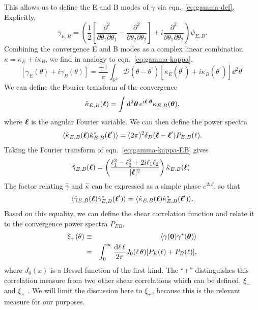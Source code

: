 This allows us to define the E and B modes of $\gamma$ via
eqn.~\ref{eq:gamma-def}.  Explicitly,
\begin{equation}
  \gamma_{E,B} = \left(\frac{1}{2}\left[\frac{\partial^2}{\partial \theta_1\partial\theta_1}
  - \frac{\partial^2}{\partial \theta_2\partial\theta_2}\right]
  + i\frac{\partial^2}{\partial \theta_1\partial\theta_2}\right)
  \psi_{E,B}.
\end{equation}
Combining the convergence E and B modes as a complex linear combination
$\kappa = \kappa_E + i\kappa_B$, we find in analogy to
eqn.~\ref{eq:gamma-kappa},
\begin{equation}
  \label{eq:gamma-kappa-EB}
  \left[\gamma_E(\theta) + i\gamma_B(\theta)\right]
  = \frac{-1}{\pi}\int_{\mathbb{R}^2} \mathcal{D}(\theta - 
  \theta^\prime)
  \left[\kappa_E(\theta^\prime) + i\kappa_B(\theta^\prime)\right]
  \dd^2\theta^\prime
\end{equation}
We can define the Fourier transform of the convergence
\begin{equation}
  \hat{\kappa}_{E,B}(\boldsymbol{\ell})
  = \int\mathrm{d}^2\boldsymbol{\theta}\,e^{i\boldsymbol{\ell}\cdot\boldsymbol{\theta}}
  \kappa_{E,B}(\boldsymbol{\theta}),
\end{equation}
where $\boldsymbol{\ell}$ is the angular Fourier variable.  We can then define
the power spectra \citep[e.g.][]{Schneider02b}
\begin{eqnarray}
  \langle\hat{\kappa}_{E, B}(\boldsymbol{\ell})
  \hat{\kappa}^\ast_{E,B}(\boldsymbol{\ell}^\prime)\rangle
  =(2\pi)^2\delta_D(\boldsymbol{\ell} - \boldsymbol{\ell}^\prime)P_{E,B}(\ell).
\end{eqnarray}
Taking the Fourier transform of eqn.~\ref{eq:gamma-kappa-EB} gives
\begin{equation}
  \hat{\gamma}_{E,B}(\boldsymbol{\ell})
  =\left(\frac{\ell_1^2 - \ell_2^2 + 2i\ell_1\ell_2}{|\boldsymbol{\ell}|^2}\right)
  \hat{\kappa}_{E,B}(\boldsymbol{\ell}).
\end{equation}
The factor relating $\hat{\gamma}$ and $\hat{\kappa}$ can be expressed
as a simple phase $e^{2i\beta}$, so that
\begin{equation}
  \langle\hat{\gamma}_{E, B}(\boldsymbol{\ell})
  \hat{\gamma}^\ast_{E,B}(\boldsymbol{\ell}^\prime)\rangle = 
  \langle\hat{\kappa}_{E, B}(\boldsymbol{\ell})
  \hat{\kappa}^\ast_{E,B}(\boldsymbol{\ell}^\prime)\rangle.
\end{equation}
Based on this equality, we can define the shear correlation function
and relate it to the convergence power spectra $P_{EB}$,
\begin{eqnarray}
  \label{eq:xi_plus}
  \xi_+(\theta)
  &\equiv& \langle\gamma(\boldsymbol{0})\gamma^\ast(\boldsymbol{\theta})\rangle\nonumber\\
  &=& \int_0^\infty\frac{\mathrm{d}\ell\,\ell}{2\pi}J_0(\ell\,\theta)
     [P_E(\ell) + P_B(\ell)],
\end{eqnarray}
where $J_0(x)$ is a Bessel function of the first kind.
The ``+'' distinguishes this correlation measure from two other shear
correlations which can be defined, $\xi_-$ and $\xi_\times$
\citep[see][for details]{Schneider02}.
We will limit the discussion here to $\xi_+$, because this is the relevant
measure for our purposes.


